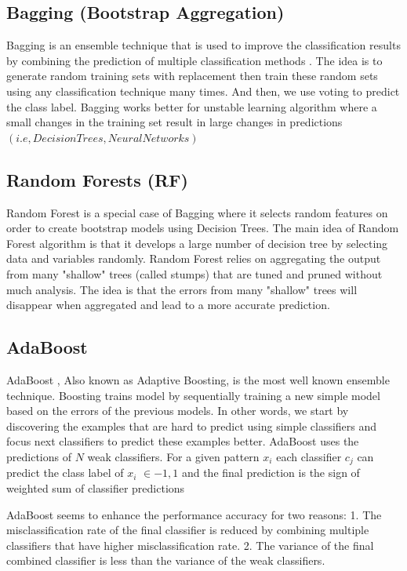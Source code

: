 \documentclass[runningheads,a4paper]{llncs}
\begin{document}
\subsection{Bagging (Bootstrap Aggregation)}
Bagging is an ensemble technique that is used to improve the classification results by combining the prediction of multiple classification methods \cite{Breiman1996}. The idea is to generate random training sets with replacement then train these random sets using any classification technique many times. And then, we use voting to predict the class label.
Bagging works better for unstable  learning algorithm where a small changes in the training set result in large changes in predictions $(i.e, Decision Trees,  Neural Networks)$

\subsection{Random Forests (RF)}
Random Forest \cite{breiman2001random} is a special case of Bagging where it selects  random features on order to create bootstrap models using Decision Trees. The main idea of Random Forest algorithm is that it develops a large number of decision tree by selecting data and variables randomly.
Random Forest relies on aggregating the output from many "shallow" trees (called stumps) that are tuned and pruned without much analysis. The idea is that the errors from many "shallow" trees will disappear when aggregated and lead to a more accurate prediction.

\subsection{AdaBoost}
AdaBoost \cite{Schapire2013}, Also known as Adaptive Boosting, is the most well known ensemble technique. Boosting trains model by sequentially training a new simple model based on the errors of the previous models. In other words, we start by discovering the examples that are hard to predict using simple classifiers and focus next classifiers to predict these examples better.
AdaBoost uses the predictions of $N$ weak classifiers. For a given pattern $x_i$ each classifier $c_j$ can predict the class label of $x_i$ $\in {-1,1}$ and the final prediction is the sign of weighted sum of classifier predictions

AdaBoost seems to enhance the performance accuracy for two reasons:
1. The misclassification rate of the final classifier is reduced by combining multiple classifiers that have higher misclassification rate.
2.  The variance of the final combined classifier is less than the variance of the weak classifiers.
\end{document}
